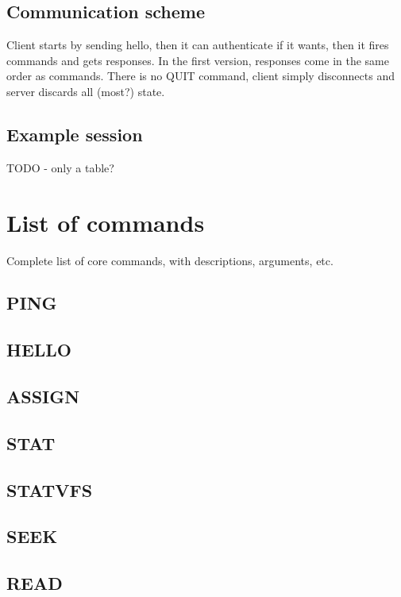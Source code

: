 \subsection{Communication scheme}

Client starts by sending hello, then it can authenticate if it wants, then it fires commands and gets
responses. In the first version, responses come in the same order as commands. There is no QUIT command,
client simply disconnects and server discards all (most?) state.

\subsection{Example session}

TODO - only a table?


\section{List of commands}

Complete list of core commands, with descriptions, arguments, etc.

\subsection{PING}

\subsection{HELLO}

\subsection{ASSIGN}

\subsection{STAT}

\subsection{STATVFS}

\subsection{SEEK}

\subsection{READ}

